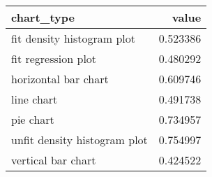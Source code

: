 \begin{tabular}{lr}
\toprule
                  chart\_type &    value \\
\midrule
  fit density histogram plot & 0.523386 \\
         fit regression plot & 0.480292 \\
        horizontal bar chart & 0.609746 \\
                  line chart & 0.491738 \\
                   pie chart & 0.734957 \\
unfit density histogram plot & 0.754997 \\
          vertical bar chart & 0.424522 \\
\bottomrule
\end{tabular}
